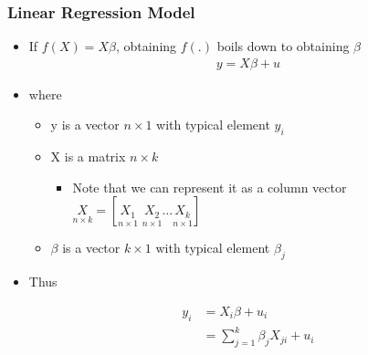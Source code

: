 \documentclass[
  shownotes,
  xcolor={svgnames},
  hyperref={colorlinks,citecolor=DarkBlue,linkcolor=DarkRed,urlcolor=DarkBlue}
  , aspectratio=169]{beamer}
\begin{document}
\begin{frame}
\frametitle{Linear Regression Model}
\bigskip

\begin{itemize}
\item  If $f(X)=X\beta$, obtaining $f(.)$ boils down to obtaining $\beta$
\begin{align}
y = X \beta +u
\end{align}

\item where 
\begin{itemize}
  \item y is a vector $n \times 1$ with typical element $y_i$
  \item X is a matrix $n \times k$ 
  \begin{itemize}
    \tiny
      \item Note that we can represent it as a column vector $\underset{n\times k}{X}=[\underset{n\times 1}{X_1}\,\,\underset{n\times 1}{X_2}\dots \underset{n\times 1}{X_k}] $
  \end{itemize}
  \item $\beta$ is a vector $k \times 1$ with typical element $\beta_j$
\end{itemize}

\bigskip
\item Thus 

\begin{align}
y_i &= X_i \beta +u_i  \\ \nonumber
    &= \sum_{j=1}^k \beta_j X_{ji} +u_i
\end{align}
\end{itemize}
\end{frame}
\end{document}
